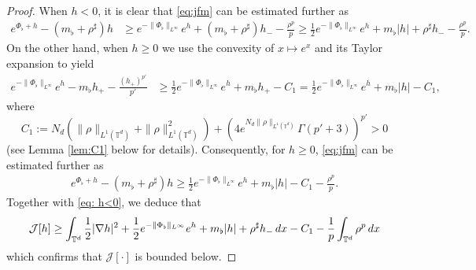 \documentclass[11pt,reqno,a4paper]{amsart}
\newcommand{\intt}{\int_{\T^d}}
\theoremstyle{definition}
\theoremstyle{remark}
\numberwithin{equation}{section}
\newcommand{\T} {\mathbb T}
\newcommand{\lt}{\left}
\newcommand{\rt}{\right}
\newcommand{\bq}{\begin{equation}}
\newcommand{\eq}{\end{equation}}
\newcommand{\calJ}{\mathcal J}
\newcommand{\dx}{\textnormal{d}x}
\begin{document}
\begin{proof}
When $h<0$, it is clear that \eqref{eq:jfm} can be estimated further as
\begin{equation}
\label{eq: h<0}
\begin{split}
    e^{\Phi_\flat + h} - \lt(m_\flat + \rho^\sharp \rt)h & \ge e^{-\|\Phi_\flat\|_{L^\infty}}e^h + \lt(m_\flat + \rho^\sharp\rt) h_- - \frac{\rho^p}{p}  \ge \frac{1}{2}e^{-\|\Phi_\flat\|_{L^\infty}}e^h + m_\flat |h| + \rho^\sharp h_- - \frac{\rho^p}{p}.
    \end{split}
\end{equation}
On the other hand, when $h\ge 0$ we use the convexity of $x \mapsto e^x$ and its Taylor expansion to yield
\begin{equation}\label{eq:c1}
\begin{split}
e^{-\|\Phi_\flat\|_{L^\infty}}e^{h}-m_\flat h_+ - \frac{(h_+)^{p'}}{p'} &\ge  \frac{1}{2}e^{-\|\Phi_\flat\|_{L^\infty}}e^{h} + m_\flat h_+ -C_1 = \frac{1}{2}e^{-\|\Phi_\flat\|_{L^\infty}}e^h + m_\flat |h| - C_1,
\end{split}
\end{equation}
where 
\bq\label{eq:c1f}
C_1:= N_d(\|\rho\|_{L^1(\T^d)} + \|\rho\|_{L^1(\T^d)}^2 ) + (4e^{N_d\|\rho\|_{L^1(\T^d)}} \Gamma(p'+3))^{p'} >0
\eq
(see Lemma \ref{lem:C1} below for details). Consequently, for $h\ge 0$, \eqref{eq:jfm} can be estimated further as
\begin{align*}
    e^{\Phi_\flat+h} - \lt(m_\flat + \rho^\sharp \rt)h \ge \frac{1}{2}e^{-\|\Phi_\flat\|_{L^\infty}} e^h + m_\flat |h| - C_1 - \frac{\rho^p}{p}.
\end{align*}
Together with \eqref{eq: h<0}, we deduce that
\bq\label{eq:jlb}
\calJ[h] \ge \intt \frac{1}{2}|\nabla h|^2 + \frac{1}{2}e^{-\|\Phi_\flat\|_{L^\infty}}e^{h} +m_\flat |h| + \rho^\sharp h_-\,\dx -C_1 - \frac{1}{p}\intt \rho^p \,\dx
\eq
which confirms that $\calJ[\cdot]$ is bounded below.

\medskip


\end{proof}
\end{document}
